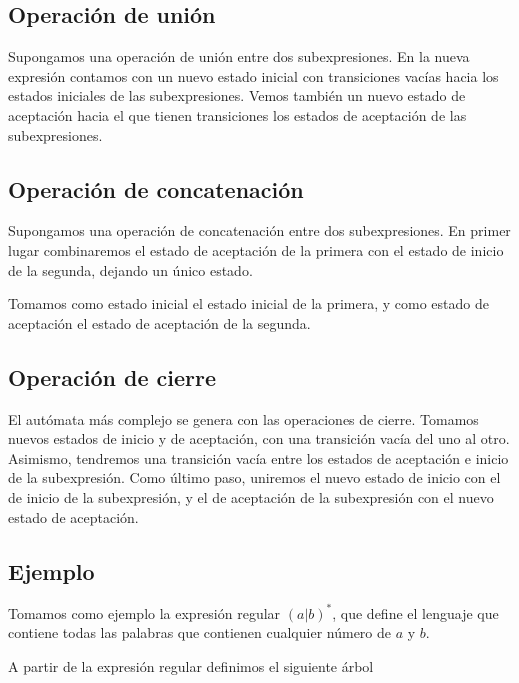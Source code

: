 \subsection{Operación de unión}
Supongamos una operación de unión entre dos subexpresiones.
En la nueva expresión contamos con un nuevo estado inicial con transiciones vacías hacia los estados iniciales de las subexpresiones.
Vemos también un nuevo estado de aceptación hacia el que tienen transiciones los estados de aceptación de las subexpresiones.


\subsection{Operación de concatenación}
Supongamos una operación de concatenación entre dos subexpresiones.
En primer lugar combinaremos el estado de aceptación de la primera con el estado de inicio de la segunda, dejando un único estado.

Tomamos como estado inicial el estado inicial de la primera, y como estado de aceptación el estado de aceptación de la segunda.


\subsection{Operación de cierre}
El autómata más complejo se genera con las operaciones de cierre.
Tomamos nuevos estados de inicio y de aceptación, con una transición vacía del uno al otro.
Asimismo, tendremos una transición vacía entre los estados de aceptación e inicio de la subexpresión.
Como último paso, uniremos el nuevo estado de inicio con el de inicio de la subexpresión, y el de aceptación de la subexpresión con el nuevo estado de aceptación.


\subsection{Ejemplo}
Tomamos como ejemplo la expresión regular $(a|b)^*$, que define el lenguaje que contiene todas las palabras que contienen cualquier número de $a$ y $b$.

A partir de la expresión regular definimos el siguiente árbol

